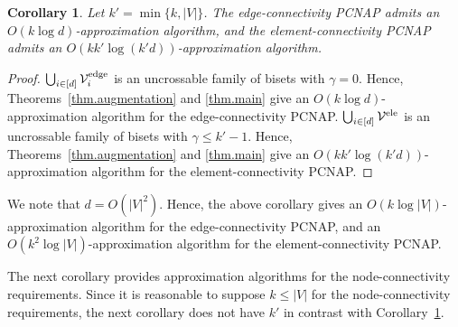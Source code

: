\documentclass[11pt]{article}
\newtheorem{corollary}{Corollary}
\newcommand{\Vfam}{\mathcal{V}}
\begin{document}
\begin{corollary}\label{cor.edge-element}
 Let $k'=\min\{k,|V|\}$.
 The edge-connectivity PCNAP admits an $O(k \log d)$-approximation
 algorithm, and
 the element-connectivity PCNAP admits an $O(k k' \log(k'd))$-approximation
 algorithm.
 \end{corollary}
\begin{proof}
$\bigcup_{i \in [d]}\Vfam_i^{\rm edge}$ is an uncrossable family of bisets with $\gamma=0$.
 Hence, Theorems~\ref{thm.augmentation} and \ref{thm.main} give
 an $O(k \log d)$-approximation algorithm for the edge-connectivity PCNAP.
$\bigcup_{i \in [d]}\Vfam^{\rm ele}$ is an uncrossable family of bisets
 with $\gamma\leq k'-1$.
 Hence, Theorems~\ref{thm.augmentation} and \ref{thm.main} give
 an $O(kk' \log (k'd))$-approximation algorithm for the element-connectivity PCNAP.
\end{proof}

We note that 
$d=O(|V|^2)$. Hence, the above corollary gives
an $O(k\log |V|)$-approximation algorithm for the edge-connectivity
PCNAP,
and an $O(k^2\log |V|)$-approximation algorithm for the element-connectivity
PCNAP.

The next corollary provides approximation algorithms for the
node-connectivity requirements.
Since it is reasonable to suppose $k\leq |V|$ for the node-connectivity
requirements,
the next corollary does not have $k'$ in contrast with Corollary~\ref{cor.edge-element}.
\end{document}

